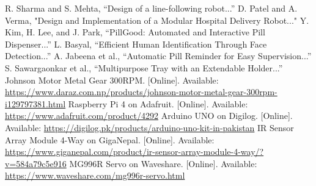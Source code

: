 \begin{thebibliography}{99}
   R. Sharma and S. Mehta, “Design of a line-following robot...”
   D. Patel and A. Verma, "Design and Implementation of a Modular Hospital Delivery Robot..."
   Y. Kim, H. Lee, and J. Park, “PillGood: Automated and Interactive Pill Dispenser...”
   L. Basyal, “Efficient Human Identification Through Face Detection...”
   A. Jabeena et al., “Automatic Pill Reminder for Easy Supervision...”
   S. Sawargaonkar et al., “Multipurpose Tray with an Extendable Holder...”
   Johnson Motor Metal Gear 300RPM. [Online]. Available: \url{https://www.daraz.com.np/products/johnson-motor-metal-gear-300rpm-i129797381.html}
   Raspberry Pi 4 on Adafruit. [Online]. Available: \url{https://www.adafruit.com/product/4292}
   Arduino UNO on Digilog. [Online]. Available: \url{https://digilog.pk/products/arduino-uno-kit-in-pakistan}
   IR Sensor Array Module 4-Way on GigaNepal. [Online]. Available: \url{https://www.giganepal.com/product/ir-sensor-array-module-4-way/?v=584a79c5e916}
   MG996R Servo on Waveshare. [Online]. Available: \url{https://www.waveshare.com/mg996r-servo.html}
\end{thebibliography}
